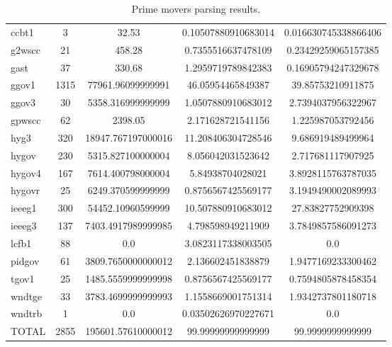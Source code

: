 \begin{table}[!ht]
	\centering
	\begin{tabular}{@{} C{2cm} 
	S[table-format=4.2,round-mode=places, round-precision=2,] 
	S[table-format=6.2,round-mode=places, round-precision=2] 
	S[table-format=3.2,round-mode=places, round-precision=2]
 	S[table-format=3.2,round-mode=places, round-precision=2] @{}} 	
		\toprule %
		\footnotesize %
		\raggedright %
			&		&		&		&		\\
		\midrule		
 ccbt1 & 3 & 32.53 & 0.10507880910683014 & 0.016630745338866406 \\
 g2wscc & 21 & 458.28 & 0.7355516637478109 & 0.23429259065157385 \\
 gast & 37 & 330.68 & 1.2959719789842383 & 0.16905794247329678 \\
 ggov1 & 1315 & 77961.96099999991 & 46.05954465849387 & 39.85753210911875 \\
 ggov3 & 30 & 5358.316999999999 & 1.0507880910683012 & 2.7394037956322967 \\
 gpwscc & 62 & 2398.05 & 2.171628721541156 & 1.225987053792456 \\
 hyg3 & 320 & 18947.767197000016 & 11.208406304728546 & 9.686919489499964 \\
 hygov & 230 & 5315.827100000004 & 8.056042031523642 & 2.717681117907925 \\
 hygov4 & 167 & 7614.400798000004 & 5.84938704028021 & 3.8928115763787035 \\
 hygovr & 25 & 6249.370599999999 & 0.8756567425569177 & 3.1949490002089993 \\
 ieeeg1 & 300 & 54452.10960599999 & 10.507880910683012 & 27.83827752909398 \\
 ieeeg3 & 137 & 7403.4917989999985 & 4.798598949211909 & 3.7849857586091273 \\
 lcfb1 & 88 & 0.0 & 3.0823117338003505 & 0.0 \\
 pidgov & 61 & 3809.7650000000012 & 2.136602451838879 & 1.9477169233300462 \\
 tgov1 & 25 & 1485.5559999999998 & 0.8756567425569177 & 0.7594805878458354 \\
 wndtge & 33 & 3783.4699999999993 & 1.1558669001751314 & 1.9342737801180718 \\
 wndtrb & 1 & 0.0 & 0.03502626970227671 & 0.0 \\
 TOTAL & 2855 & 195601.57610000012 & 99.99999999999999 & 99.9999999999999 \\
		\bottomrule
	\end{tabular}
	\caption{Prime movers parsing results.}
	\label{tab: dydParse Prime Movers }
\end{table}